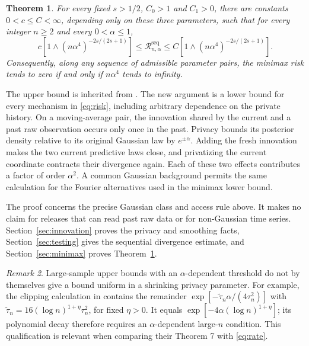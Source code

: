 \documentclass[11pt]{article}
\newtheorem{theorem}{Theorem}
\theoremstyle{remark}
\newtheorem{remark}[theorem]{Remark}
\newcommand{\risk}{\mathcal R^{\mathrm{seq}}_{n,\alpha}}
\begin{document}
\begin{theorem}\label{thm:main}
For every fixed $s>1/2$, $C_0>1$ and $C_1>0$, there are constants
$0<c\le C<\infty$, depending only on these three parameters, such that
for every integer $n\ge2$ and every $0<\alpha\le1$,
\begin{equation}\label{eq:rate}
 c\left[1\wedge(n\alpha^4)^{-2s/(2s+1)}\right]
 \le \risk\le
 C\left[1\wedge(n\alpha^4)^{-2s/(2s+1)}\right].
\end{equation}
Consequently, along any sequence of admissible parameter pairs, the minimax
risk tends to zero if and only if $n\alpha^4$ tends to infinity.
\end{theorem}

The upper bound is inherited from \cite[Theorem 3]{IR}. The new argument is
a lower bound for every mechanism in \eqref{eq:risk}, including arbitrary
dependence on the private history. On a moving-average pair, the innovation
shared by the current and a past raw observation occurs only once in the
past. Privacy bounds its posterior density relative to its original Gaussian
law by $e^{\pm\alpha}$. Adding the fresh innovation makes the two current
predictive laws close, and privatizing the current coordinate contracts their
divergence again. Each of these two effects contributes a factor of order
$\alpha^2$. A common Gaussian background permits the same calculation for
the Fourier alternatives used in the minimax lower bound.

The proof concerns the precise Gaussian class and access rule above.
It makes no claim for releases that can read past raw data or for
non-Gaussian time series. Section~\ref{sec:innovation} proves the privacy and
smoothing facts, Section~\ref{sec:testing} gives the sequential divergence
estimate, and Section~\ref{sec:minimax} proves Theorem~\ref{thm:main}.

\begin{remark}\label{rem:largen}
Large-sample upper bounds with an $\alpha$-dependent threshold do not by
themselves give a bound uniform in a shrinking privacy parameter.
For example, the clipping calculation in \cite[Appendix A.3, p.\,27]{BKK}
contains the remainder
$\exp[-\widetilde\tau_n\alpha/(4\tau_n^2)]$ with
$\widetilde\tau_n=16(\log n)^{1+\eta}\tau_n^2$, for fixed $\eta>0$.
It equals $\exp[-4\alpha(\log n)^{1+\eta}]$; its polynomial decay therefore
requires an $\alpha$-dependent large-$n$ condition. This qualification is
relevant when comparing their Theorem 7 with \eqref{eq:rate}.
\end{remark}
\end{document}
